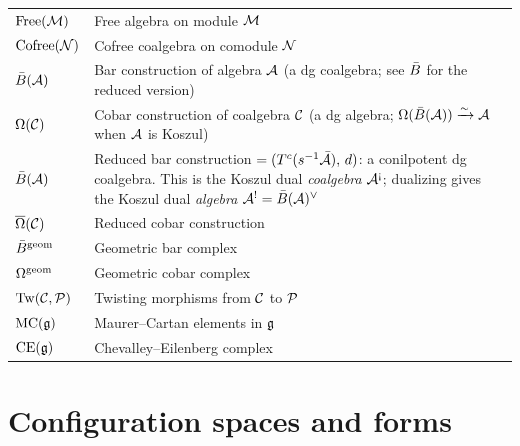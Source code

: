 \begin{longtable}{p{3cm} p{10cm}}
$\operatorname{Free}(\mathcal{M})$ & Free algebra on module $\mathcal{M}$ \\
$\operatorname{Cofree}(\mathcal{N})$ & Cofree coalgebra on comodule $\mathcal{N}$ \\
$\bar{B}(\mathcal{A})$ & Bar construction of algebra $\mathcal{A}$ (a dg coalgebra; see $\bar{B}$ for the reduced version) \\
$\Omega(\mathcal{C})$ & Cobar construction of coalgebra $\mathcal{C}$ (a dg algebra; $\Omega(\bar{B}(\mathcal{A})) \xrightarrow{\sim} \mathcal{A}$ when $\mathcal{A}$ is Koszul) \\
$\bar{B}(\mathcal{A})$ & Reduced bar construction $= (T^c(s^{-1}\bar{\mathcal{A}}),\, d)$: a conilpotent dg coalgebra.  This is the Koszul dual \emph{coalgebra} $\cA^{\text{\textexclamdown}}$; dualizing gives the Koszul dual \emph{algebra} $\mathcal{A}^! = \bar{B}(\mathcal{A})^\vee$ \\
$\overline{\Omega}(\mathcal{C})$ & Reduced cobar construction \\
$\bar{B}^{\mathrm{geom}}$ & Geometric bar complex \\
$\Omega^{\mathrm{geom}}$ & Geometric cobar complex \\
$\mathrm{Tw}(\mathcal{C}, \mathcal{P})$ & Twisting morphisms from $\mathcal{C}$ to $\mathcal{P}$ \\
$\text{MC}(\mathfrak{g})$ & Maurer--Cartan elements in $\mathfrak{g}$ \\
$\mathrm{CE}(\mathfrak{g})$ & Chevalley--Eilenberg complex \\
\end{longtable}


\section{Configuration spaces and forms}
\label{sec:notation-config}


